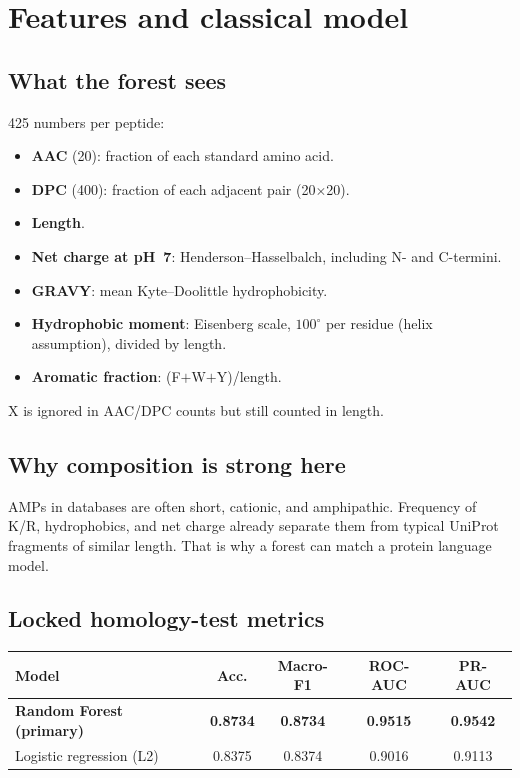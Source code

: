 \documentclass[11pt,a4paper]{report}
\begin{document}
\chapter{Features and classical model}
\label{ch:rf}

\section{What the forest sees}

425 numbers per peptide:
\begin{itemize}
\item \textbf{AAC} (20): fraction of each standard amino acid.
\item \textbf{DPC} (400): fraction of each adjacent pair (20$\times$20).
\item \textbf{Length}.
\item \textbf{Net charge at pH~7}: Henderson--Hasselbalch, including N- and C-termini.
\item \textbf{GRAVY}: mean Kyte--Doolittle hydrophobicity.
\item \textbf{Hydrophobic moment}: Eisenberg scale, $100^\circ$ per residue (helix assumption), divided by length.
\item \textbf{Aromatic fraction}: (F$+$W$+$Y)/length.
\end{itemize}

X is ignored in AAC/DPC counts but still counted in length.

\section{Why composition is strong here}

AMPs in databases are often short, cationic, and amphipathic. Frequency of K/R, hydrophobics, and net charge already separate them from typical UniProt fragments of similar length. That is why a forest can match a protein language model.

\section{Locked homology-test metrics}

\begin{tabular}{lcccc}
\toprule
Model & Acc. & Macro-F1 & ROC-AUC & PR-AUC \\
\midrule
\textbf{Random Forest (primary)} & \textbf{0.8734} & \textbf{0.8734} & \textbf{0.9515} & \textbf{0.9542} \\
Logistic regression (L2) & 0.8375 & 0.8374 & 0.9016 & 0.9113 \\
\bottomrule
\end{tabular}
\end{document}
